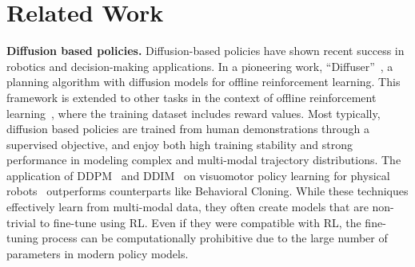 \section{Related Work}

\textbf{Diffusion based policies.} 
Diffusion-based policies have shown recent success in robotics and decision-making applications. In a pioneering work, “Diffuser”~\cite{janner2022planning}, a planning algorithm
with diffusion models for offline reinforcement learning.
This framework is extended to other tasks in the context of
offline reinforcement learning~\cite{wang2022diffusion}, where the
training dataset includes reward values.
Most typically, diffusion based policies are trained from human demonstrations through a supervised objective, and enjoy both high training stability and strong performance in modeling complex and multi-modal trajectory distributions. 
The application of DDPM~\cite{ddpm} and DDIM~\cite{ddim} on visuomotor policy learning for physical robots~\cite{dp} outperforms counterparts like Behavioral Cloning.
While these techniques effectively learn
from multi-modal data, they often create models that are non-trivial to fine-tune using RL. Even if they were compatible with RL, the fine-tuning process can be computationally prohibitive due to the large number of parameters in modern policy models. 

